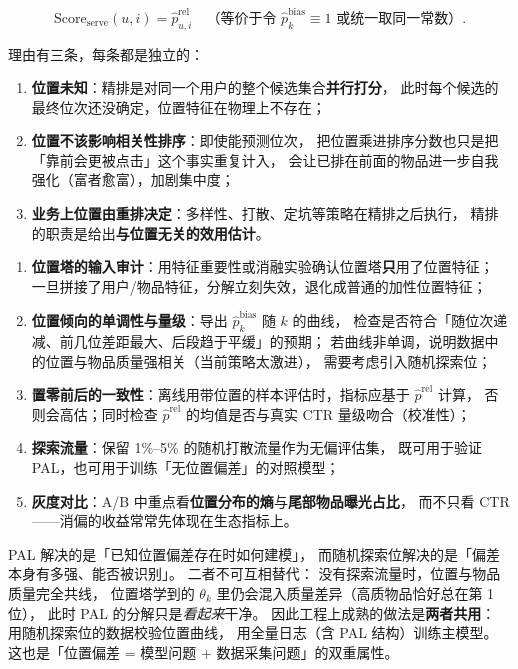 \begin{equation}
\mathrm{Score}_{\text{serve}}(u, i) = \hat{p}^{\mathrm{rel}}_{u,i}
\quad \text{（等价于令 } \hat{p}^{\mathrm{bias}}_k \equiv 1 \text{ 或统一取同一常数）} .
\label{eq:pal-serve}
\end{equation}

理由有三条，每条都是独立的：
\begin{enumerate}
  \item \textbf{位置未知}：精排是对同一个用户的整个候选集合\textbf{并行打分}，
        此时每个候选的最终位次还没确定，位置特征在物理上不存在；
  \item \textbf{位置不该影响相关性排序}：即使能预测位次，
        把位置乘进排序分数也只是把「靠前会更被点击」这个事实重复计入，
        会让已排在前面的物品进一步自我强化（富者愈富），加剧集中度；
  \item \textbf{业务上位置由重排决定}：多样性、打散、定坑等策略在精排之后执行，
        精排的职责是给出\textbf{与位置无关的效用估计}。
\end{enumerate}

\begin{toolbox}
\begin{enumerate}
  \item \textbf{位置塔的输入审计}：用特征重要性或消融实验确认位置塔\textbf{只}用了位置特征；
        一旦拼接了用户/物品特征，分解立刻失效，退化成普通的加性位置特征；
  \item \textbf{位置倾向的单调性与量级}：导出 $\hat{p}^{\mathrm{bias}}_k$ 随 $k$ 的曲线，
        检查是否符合「随位次递减、前几位差距最大、后段趋于平缓」的预期；
        若曲线非单调，说明数据中的位置与物品质量强相关（当前策略太激进），
        需要考虑引入随机探索位；
  \item \textbf{置零前后的一致性}：离线用带位置的样本评估时，指标应基于 $\hat{p}^{\mathrm{rel}}$ 计算，
        否则会高估；同时检查 $\hat{p}^{\mathrm{rel}}$ 的均值是否与真实 CTR 量级吻合（校准性）；
  \item \textbf{探索流量}：保留 1\%--5\% 的随机打散流量作为无偏评估集，
        既可用于验证 PAL，也可用于训练「无位置偏差」的对照模型；
  \item \textbf{灰度对比}：A/B 中重点看\textbf{位置分布的熵}与\textbf{尾部物品曝光占比}，
        而不只看 CTR——消偏的收益常常先体现在生态指标上。
\end{enumerate}
\end{toolbox}

\begin{insight}
PAL 解决的是「已知位置偏差存在时如何建模」，
而随机探索位解决的是「偏差本身有多强、能否被识别」。
二者不可互相替代：
没有探索流量时，位置与物品质量完全共线，
位置塔学到的 $\theta_k$ 里仍会混入质量差异（高质物品恰好总在第 1 位），
此时 PAL 的分解只是\emph{看起来}干净。
因此工程上成熟的做法是\textbf{两者共用}：
用随机探索位的数据校验位置曲线，
用全量日志（含 PAL 结构）训练主模型。
这也是「位置偏差 = 模型问题 + 数据采集问题」的双重属性。
\end{insight}

